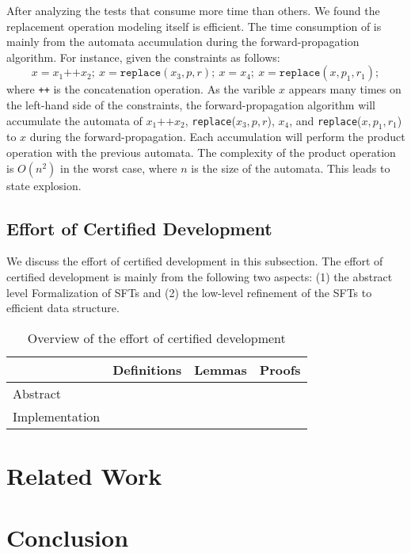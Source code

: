 \documentclass[a4paper,UKenglish,cleveref, autoref, anonymous, thm-restate]{lipics-v2021}
\begin{document}
After analyzing the tests that consume more time than others. We found the replacement operation modeling itself is efficient. The time consumption of is mainly from the automata accumulation during the forward-propagation algorithm. For instance, given the constraints as follows: 
\[
x=x_1\texttt{++}x_2;~x = \texttt{replace}(x_3, p, r);~x = x_4;~x = \texttt{replace}(x, p_1, r_1);
\]
where \texttt{++} is the concatenation operation. As the varible $x$ appears many times on the left-hand side of the constraints, the forward-propagation algorithm will accumulate the automata of $x_1\texttt{++}x_2$, \texttt{replace}($x_3, p, r$), $x_4$, and \texttt{replace}($x, p_1, r_1$) to $x$ during the forward-propagation. Each accumulation will perform the product operation with the previous automata. The complexity of the product operation is $O(n^2)$ in the worst case, where $n$ is the size of the automata. This leads to state explosion.

\subsection{Effort of Certified Development}

We discuss the effort of certified development in this subsection.
The effort of certified development is mainly from the following two aspects: (1) the abstract level Formalization of SFTs and (2) the low-level refinement of the SFTs to efficient data structure.


\begin{table}[h]
  \centering
  \begin{tabular}{lccc}
      \toprule
      & \textbf{Definitions} & \textbf{Lemmas} & \textbf{Proofs} \\
      \midrule
      Abstract & & & \\
      Implementation & & & \\
      \bottomrule
  \end{tabular}
  \caption{Overview of the effort of certified development}
  \label{tab:abstract_impl}
\end{table}


\section{Related Work}
\label{sec:related-work}


\section{Conclusion}
\label{sec:conclusion}



\end{document}
